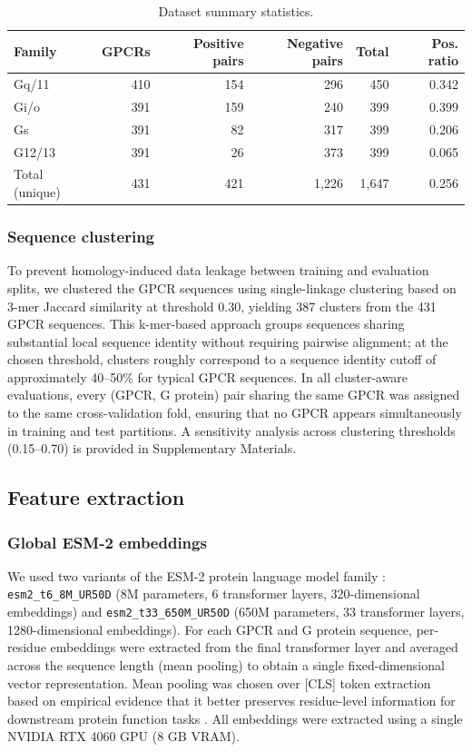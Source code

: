\documentclass[11pt,a4paper]{article}
\begin{document}
\begin{table}[t]
\centering
\caption{Dataset summary statistics.}
\label{tab:dataset}
\begin{tabular}{lrrrrr}
\toprule
Family & GPCRs & Positive pairs & Negative pairs & Total & Pos. ratio \\
\midrule
Gq/11  & 410 & 154 & 296 & 450 & 0.342 \\
Gi/o   & 391 & 159 & 240 & 399 & 0.399 \\
Gs     & 391 &  82 & 317 & 399 & 0.206 \\
G12/13 & 391 &  26 & 373 & 399 & 0.065 \\
\midrule
Total (unique) & 431 & 421 & 1,226 & 1,647 & 0.256 \\
\bottomrule
\end{tabular}
\end{table}

\subsubsection{Sequence clustering}

To prevent homology-induced data leakage between training and evaluation splits, we clustered the GPCR sequences using single-linkage clustering based on 3-mer Jaccard similarity at threshold 0.30, yielding 387 clusters from the 431 GPCR sequences. This k-mer-based approach groups sequences sharing substantial local sequence identity without requiring pairwise alignment; at the chosen threshold, clusters roughly correspond to a sequence identity cutoff of approximately 40--50\% for typical GPCR sequences. In all cluster-aware evaluations, every (GPCR, G protein) pair sharing the same GPCR was assigned to the same cross-validation fold, ensuring that no GPCR appears simultaneously in training and test partitions. A sensitivity analysis across clustering thresholds (0.15--0.70) is provided in Supplementary Materials.

\subsection{Feature extraction}

\subsubsection{Global ESM-2 embeddings}

We used two variants of the ESM-2 protein language model family \cite{lin2023evolutionary}: \texttt{esm2\_t6\_8M\_UR50D} (8M parameters, 6 transformer layers, 320-dimensional embeddings) and \texttt{esm2\_t33\_650M\_UR50D} (650M parameters, 33 transformer layers, 1280-dimensional embeddings). For each GPCR and G protein sequence, per-residue embeddings were extracted from the final transformer layer and averaged across the sequence length (mean pooling) to obtain a single fixed-dimensional vector representation. Mean pooling was chosen over [CLS] token extraction based on empirical evidence that it better preserves residue-level information for downstream protein function tasks \cite{detlefsen2022evaluation}. All embeddings were extracted using a single NVIDIA RTX 4060 GPU (8 GB VRAM).
\end{document}
